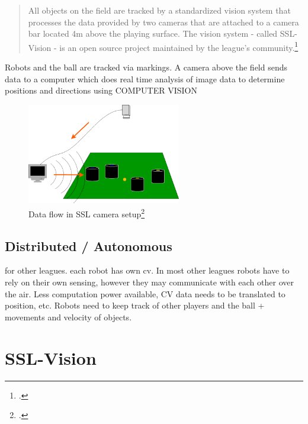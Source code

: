 \begin{quote}
All objects on the field are tracked by a standardized vision system that
processes the data provided by two cameras that are attached to a camera bar
located 4m above the playing surface. The vision system - called SSL-Vision - is
an open source project maintained by the league's community.\footcite[Cf.][]{robo_ssl_wiki}
\end{quote}

Robots and the ball are tracked via markings. A camera above the field sends
data to a computer which does real time analysis of image data to determine
positions and directions using COMPUTER VISION

\begin{savenotes}
\begin{figure}[htbp]
\begin{center}
  \includegraphics[width=0.6\textwidth]{img/ssl_dataflow.png}
  \caption[Data flow in SSL camera setup]{Data flow in SSL camera setup\footcite[][]{robo_ssl_wiki}}
  \label{fig:ssl_dataflow}
\end{center}
\end{figure}
\end{savenotes}

\subsection{Distributed / Autonomous}
for other leagues. each robot has own cv.
In most other leagues robots have to rely on their own sensing, however they may
communicate with each other over the air.
Less computation power available, CV data needs to be translated to position,
etc. Robots need to keep track of other players and the ball + movements and
velocity of objects.



\newpage
\section{SSL-Vision \label{sec:ssl-vision}}


